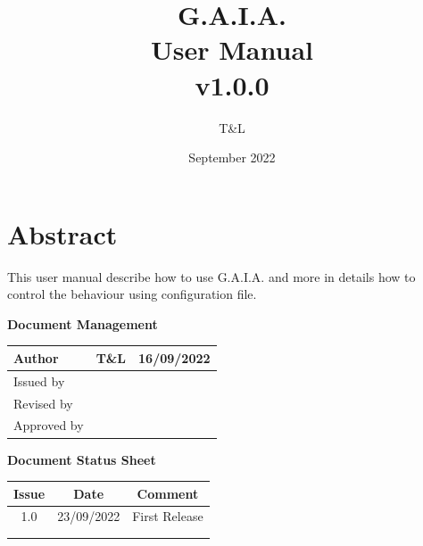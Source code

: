\documentclass[12pt, a4paper]{book}
\title{\textbf{{\LARGE G.A.I.A.} \\ User Manual \\ {\small v1.0.0} }}
\author{T\&L}
\date{September 2022}
\newcommand*{\thead}[1]{\multicolumn{1}{|c|}{\bfseries #1}}
\begin{document}
\maketitle

\newpage
\section {Abstract}

\begin{justify}
This user manual describe how to use G.A.I.A. and more in details how to control the behaviour using configuration file.
\end{justify}



\tableofcontents


\newpage
\begin{center}
\textbf{{\large Document Management}}
\end{center}

\begin{table}[h]
\centering
	\begin{tabular}{|l|l|c|}
	\hline
	Author & T\&L & 16/09/2022 \\
	\hline	
	Issued by & & \\
	\hline
	Revised by & & \\
	\hline
	Approved by & & \\
	\hline
	\end{tabular}	 	
\end{table}

\begin{center}
\textbf{{\large Document Status Sheet}}
\end{center}

\begin{table}[h]
\centering
	\begin{tabular}{|c|c|l|}
	\hline
	\thead{ Issue } & \thead{ Date } & \thead{ Comment } \\
	\hline	
	1.0 & 23/09/2022 & First Release \\
	\hline
	& & \\
	\hline
	& & \\
	\hline
	\end{tabular}	 	
\end{table}
\end{document}

